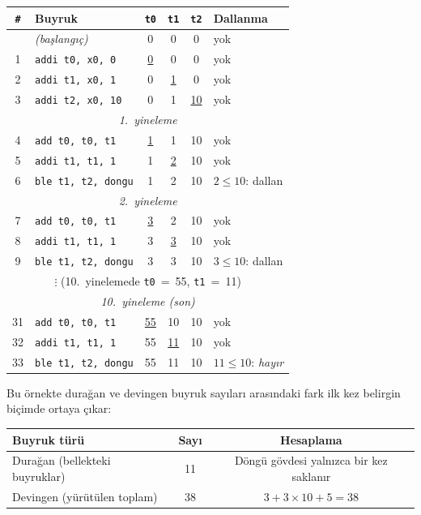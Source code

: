 \begin{ornek}[4.5]
\begin{center}
\small
\begin{tabular}{clcccl}
\toprule
\texttt{\#} & Buyruk & \texttt{t0} & \texttt{t1} & \texttt{t2} & Dallanma \\
\midrule
  & \emph{(başlangıç)} & 0 & 0 & 0 & yok \\
1 & \texttt{addi t0, x0, 0} & \underline{0} & 0 & 0 & yok \\
2 & \texttt{addi t1, x0, 1} & 0 & \underline{1} & 0 & yok \\
3 & \texttt{addi t2, x0, 10} & 0 & 1 & \underline{10} & yok \\
\midrule
\multicolumn{6}{c}{\emph{1.~yineleme}} \\
4 & \texttt{add t0, t0, t1} & \underline{1} & 1 & 10 & yok \\
5 & \texttt{addi t1, t1, 1} & 1 & \underline{2} & 10 & yok \\
6 & \texttt{ble t1, t2, dongu} & 1 & 2 & 10 & $2 \leq 10$: dallan \\
\midrule
\multicolumn{6}{c}{\emph{2.~yineleme}} \\
7 & \texttt{add t0, t0, t1} & \underline{3} & 2 & 10 & yok \\
8 & \texttt{addi t1, t1, 1} & 3 & \underline{3} & 10 & yok \\
9 & \texttt{ble t1, t2, dongu} & 3 & 3 & 10 & $3 \leq 10$: dallan \\
\midrule
\multicolumn{6}{c}{$\vdots$ \quad (10.~yinelemede \texttt{t0}~=~55, \texttt{t1}~=~11)} \\
\midrule
\multicolumn{6}{c}{\emph{10.~yineleme (son)}} \\
31 & \texttt{add t0, t0, t1} & \underline{55} & 10 & 10 & yok \\
32 & \texttt{addi t1, t1, 1} & 55 & \underline{11} & 10 & yok \\
33 & \texttt{ble t1, t2, dongu} & 55 & 11 & 10 & $11 \leq 10$: \emph{hayır} \\
\bottomrule
\end{tabular}
\end{center}

Bu örnekte durağan ve devingen buyruk sayıları arasındaki fark ilk kez belirgin biçimde ortaya çıkar:

\begin{center}
\small
\begin{tabular}{lcc}
\toprule
Buyruk türü & Sayı & Hesaplama \\
\midrule
Durağan (bellekteki buyruklar) & 11 & Döngü gövdesi yalnızca bir kez saklanır \\
Devingen (yürütülen toplam) & 38 & $3 + 3 \times 10 + 5 = 38$ \\
\bottomrule
\end{tabular}
\end{center}


\end{ornek}

